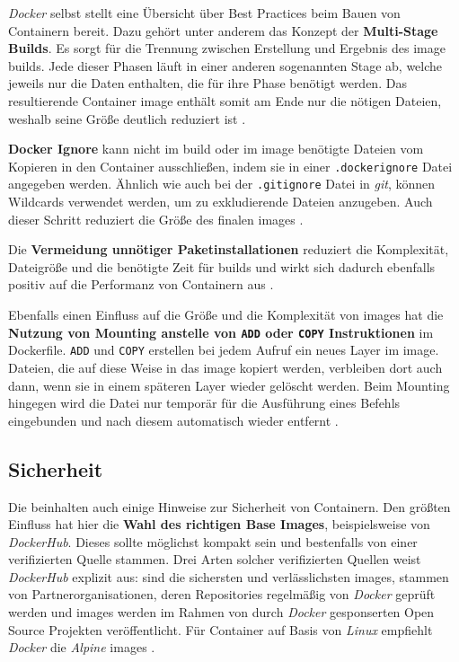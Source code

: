 \textit{Docker} selbst stellt eine Übersicht über Best Practices beim Bauen von Containern bereit. Dazu gehört unter anderem das Konzept der \textbf{Multi-Stage Builds}. Es sorgt für die Trennung zwischen Erstellung und Ergebnis des \Gls{image} \Glspl{build}. Jede dieser Phasen läuft in einer anderen sogenannten Stage ab, welche jeweils nur die Daten enthalten, die für ihre Phase benötigt werden. Das resultierende Container \Gls{image} enthält somit am Ende nur die nötigen Dateien, weshalb seine Größe deutlich reduziert ist \cite{300:Building-Best-Practices}.

\textbf{Docker Ignore} kann nicht im \Gls{build} oder im \Gls{image} benötigte Dateien vom Kopieren in den Container ausschließen, indem sie in einer \texttt{.dockerignore} Datei angegeben werden. Ähnlich wie auch bei der \texttt{.gitignore} Datei in \textit{\Gls{git}}, können Wildcards verwendet werden, um zu exkludierende Dateien anzugeben. Auch dieser Schritt reduziert die Größe des finalen \Glspl{image} \cite{300:Building-Best-Practices}.

Die \textbf{Vermeidung unnötiger Paketinstallationen} reduziert die Komplexität, Dateigröße und die benötigte Zeit für \Glspl{build} und wirkt sich dadurch ebenfalls positiv auf die Performanz von Containern aus \cite{300:Building-Best-Practices}.

Ebenfalls einen Einfluss auf die Größe und die Komplexität von \Glspl{image} hat die \textbf{Nutzung von Mounting anstelle von \texttt{ADD} oder \texttt{COPY} Instruktionen} im Dockerfile. \texttt{ADD} und \texttt{COPY} erstellen bei jedem Aufruf ein neues Layer im \Gls{image}. Dateien, die auf diese Weise in das \Gls{image} kopiert werden, verbleiben dort auch dann, wenn sie in einem späteren Layer wieder gelöscht werden. Beim Mounting hingegen wird die Datei nur temporär für die Ausführung eines Befehls eingebunden und nach diesem automatisch wieder entfernt \cite{300:Building-Best-Practices}.

\subsection{Sicherheit}
\label{subsec:05-03-02_security}

Die  beinhalten auch einige Hinweise zur Sicherheit von Containern. Den größten Einfluss hat hier die \textbf{Wahl des richtigen Base Images}, beispielsweise von \textit{DockerHub}. Dieses sollte möglichst kompakt sein und bestenfalls von einer verifizierten Quelle stammen. Drei Arten solcher verifizierten Quellen weist \textit{DockerHub} explizit aus:  sind die sichersten und verlässlichsten \Glspl{image},  stammen von Partnerorganisationen, deren Repositories regelmäßig von \textit{Docker} geprüft werden und  \Glspl{image} werden im Rahmen von durch \textit{Docker} gesponserten Open Source Projekten veröffentlicht. Für Container auf Basis von \textit{Linux} empfiehlt \textit{Docker} die \textit{Alpine} \Glspl{image} \cite{300:Building-Best-Practices}.

